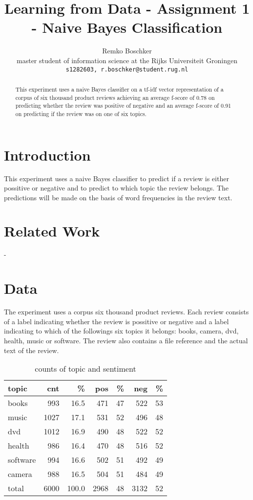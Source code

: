 \documentclass[11pt]{article}
\title{Learning from Data - Assignment 1 - Naive Bayes Classification}
\author{Remko Boschker \\
  master student of information science at the Rijks Universiteit Groningen \\
  {\tt s1282603, r.boschker@student.rug.nl} }
\date{}
\begin{document}
\maketitle
\begin{abstract}
This experiment uses a naive Bayes classifier on a tf-idf vector representation of a corpus of six thousand product reviews achieving an average f-score of 0.78 on predicting whether the review was positive of negative and an average f-score of 0.91 on predicting if the review was on one of six topics.
\end{abstract}



\section{Introduction}

This experiment uses a naive Bayes classifier to predict if a review is either possitive or negative and to predict to which topic the review belongs. The predictions will be made on the basis of word frequencies in the review text.

\section{Related Work}

-

\section{Data}

The experiment uses a corpus six thousand product reviews. Each review consists of a label indicating whether the review is possitive or negative and a label indicating to which of the followings six topics it belongs: books, camera, dvd, health, music or software. The review also contains a file reference and the actual text of the review.

\begin{table}[h]\footnotesize
\begin{tabular}{ l r r r r r r }
topic & cnt & \% & pos & \% & neg & \% \\
\hline
books & 993 & 16.5 & 471 & 47 & 522 & 53 \\
music & 1027 & 17.1 & 531 & 52 & 496 & 48 \\
dvd & 1012 & 16.9 & 490 & 48 & 522 & 52 \\
health & 986 & 16.4 & 470 & 48 & 516 & 52 \\
software & 994 & 16.6 & 502 & 51 & 492 & 49 \\
camera & 988 & 16.5 & 504 & 51 & 484 & 49 \\
\hline
total & 6000 & 100.0 & 2968 & 48 & 3132 & 52 \\
\end{tabular}
\caption{counts of topic and sentiment}
\end{table}
\end{document}
